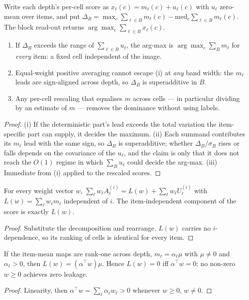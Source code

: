 \begin{theorem}\label{thm:tail}
Write each depth's per-cell score as $x_\ell(c)=m_\ell(c)+u_\ell(c)$ with $u_\ell$ zero-mean over items, and put
$\Delta_B=\max_c\sum_{\ell\in B}m_\ell(c)-\mathrm{med}_c\sum_{\ell\in B}m_\ell(c)$. The block read-out returns
$\arg\max_c\sum_{\ell\in B}x_\ell(c)$.
\begin{enumerate}\itemsep0pt
\item[(i)] If $\Delta_B$ exceeds the range of $\sum_{\ell\in B}u_\ell$, the arg-max is
  $\arg\max_c\sum_B m_\ell$ for \emph{every} item: a fixed cell independent of the image.
\item[(ii)] Equal-weight positive averaging cannot escape (i) at \emph{any} band width: the $m_\ell$ leads are
  sign-aligned across depth, so $\Delta_B$ is superadditive in $B$.
\item[(iii)] Any per-cell rescaling that equalises $m$ across cells --- in particular dividing by an estimate of
  $m$ --- removes the dominance without using labels.
\end{enumerate}
\end{theorem}
\begin{proof}
(i) If the deterministic part's lead exceeds the total variation the item-specific part can supply, it decides the
maximum. (ii) Each summand contributes its $m_\ell$ lead with the same sign, so $\Delta_B$ is superadditive; whether
$\Delta_B/\sigma_B$ rises or falls depends on the covariance of the $u_\ell$, and the claim is only that it does not
reach the $O(1)$ regime in which $\sum_B u_\ell$ could decide the arg-max. (iii) Immediate from (i) applied to the
rescaled scores.
\end{proof}

\begin{lemma}\label{lem:leak}
For every weight vector $w$, $\sum_\ell w_\ell A_\ell^{(i)}=L(w)+\sum_\ell w_\ell U_\ell^{(i)}$ with
$L(w)=\sum_\ell w_\ell m_\ell$ independent of $i$. The item-independent component of the score is exactly $L(w)$.
\end{lemma}
\begin{proof}
Substitute the decomposition and rearrange. $L(w)$ carries no $i$-dependence, so its ranking of cells is identical
for every item.
\end{proof}

\begin{lemma}\label{lem:nn}
If the item-mean maps are rank-one across depth, $m_\ell=\alpha_\ell\mu$ with $\mu\neq0$ and $\alpha_\ell>0$, then
$L(w)=(\alpha^\top w)\mu$. Hence $L(w)=0$ iff $\alpha^\top w=0$; no non-zero $w\ge0$ achieves zero leakage.
\end{lemma}
\begin{proof}
Linearity, then $\alpha^\top w=\sum_\ell\alpha_\ell w_\ell>0$ whenever $w\ge0$, $w\neq0$.
\end{proof}

